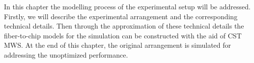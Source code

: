 
In this chapter the modelling process of the experimental setup will be addressed. Firstly, we will describe the experimental arrangement and the corresponding technical details. Then through the approximation of these technical details the fiber-to-chip models for the simulation can be constructed with the aid of CST MWS. At the end of this chapter, the original arrangement is simulated for addressing the unoptimized performance.
